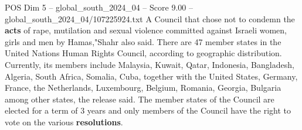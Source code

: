 \begin{textsample}{POS Dim 5 – global\_south\_2024\_04 – Score 9.00 – global\_south\_2024\_04/107225924.txt}
A Council that chose not to condemn the \textbf{acts} of rape, mutilation and sexual violence committed against Israeli women, girls and men by Hamas,"Shahr also said.
There are 47 member states in the United Nations Human Rights Council, according to geographic distribution.
Currently, its members include Malaysia, Kuwait, Qatar, Indonesia, Bangladesh, Algeria, South Africa, Somalia, Cuba, together with the United States, Germany, France, the Netherlands, Luxembourg, Belgium, Romania, Georgia, Bulgaria among other states, the release said.
The member states of the Council are elected for a term of 3 years and only members of the Council have the right to vote on the various \textbf{resolutions}.

\end{textsample}
